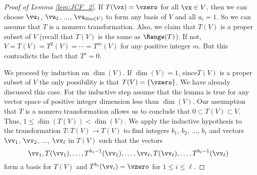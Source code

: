 \begin{proof}[Proof of Lemma \ref{lem:JCF_2}] If $T(\vx) = \vzero$ for all $\vx \in V$, then we can choose $\vu_1$, $\vu_2$, $\ldots$, $\vu_{\dim(V)}$ to form any basis of $V$ and all $a_i = 1$. So we can assume that $T$ is a nonzero transformation. Also, we claim that $T(V)$ is a proper subset of $V$ (recall that $T(V)$ is the same as $\Range(T)$). If not, $V = T(V) = T^2(V) = \cdots = T^m(V)$ for any positive integer $m$. But this contradicts the fact that $T^s = 0$. 

We proceed by induction on $\dim(V)$. If $\dim(V) = 1$, since$T(V)$ is a proper subset of $V$ the only possibility is that $T(V) = \{\vzero\}$. We have already discussed this case. For the inductive step assume that the lemma is true for any vector space of positive integer dimension less than $\dim(V)$.  Our assumption that $T$ is a nonzero transformation allows us to conclude that $0 \subset T(V) \subset V$. Thus, $1 \leq \dim(T(V)) < \dim(V)$. We apply the inductive hypothesis to the transformation $T: T(V) \to T(V)$ to find integers $b_1$, $b_2$, $\ldots$, $b_{\ell}$ and vectors $\vv_1$, $\vv_2$, $\ldots$, $\vv_{\ell}$ in $T(V)$ such that the vectors 
\begin{equation} \label{eq:JCF_TV_basis} 
\vv_1, T(\vv_1), \ldots, T^{b_1-1}(\vv_1), \ldots, \vv_{\ell}, T(\vv_{\ell}), \ldots, T^{b_{\ell}-1}(\vv_{\ell})
\end{equation}
form a basis for $T(V)$ and $T^{b_i}(\vv_i) = \vzero$ for $1 \leq i \leq \ell$. 


\end{proof}

